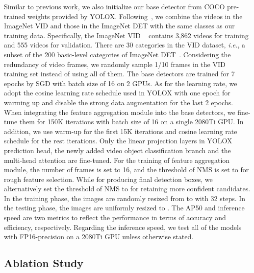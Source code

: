 \documentclass[letterpaper]{article} \usepackage{aaai23}  \usepackage{times}  \usepackage{helvet}  \usepackage{courier}  \usepackage[hyphens]{url}  \usepackage{graphicx} \urlstyle{rm} \def\UrlFont{\rm}  \usepackage{natbib}  \usepackage{caption} \usepackage{xcolor}
\begin{document}
Similar to previous work, we also initialize our base detector from COCO pre-trained weights provided by YOLOX. Following~\cite{zhu2017flow,wu2019sequence,gong2021temporal}, we combine the videos in the ImageNet VID and those in the ImageNet DET with the same classes as our training data. Specifically, the ImageNet VID ~\cite{russakovsky2015imagenet} contains 3,862 videos for training and 555 videos for validation. There are 30 categories in the VID dataset, \emph{i.e.}, a subset of the 200 basic-level categories of ImageNet DET~\cite{russakovsky2015imagenet}.  Considering the redundancy of video frames, we randomly sample 1/10 frames in the VID training set instead of using all of them. The base detectors are trained for 7 epochs by SGD with batch size of 16 on 2 GPUs. As for the learning rate, we adopt the cosine learning rate schedule used in YOLOX with one epoch for warming up and disable the strong data augmentation for the last 2 epochs. When integrating the feature aggregation module into the base detectors, we fine-tune them for 150K iterations with batch size of 16 on a single 2080Ti GPU. In addition, we use warm-up for the first 15K iterations and cosine learning rate schedule for the rest iterations. Only the linear projection layers in YOLOX prediction head, the newly added video object classification branch and the multi-head attention are fine-tuned. For the training of feature aggregation module, the number of frames  is set to 16, and the threshold of NMS is set to  for rough feature selection. While for producing final detection boxes, we alternatively set the threshold of NMS to  for retaining more confident candidates. In the training phase, the images are randomly resized from  to  with 32 steps. In the testing phase, the images are uniformly resized to . The AP50 and inference speed are two metrics to reflect the performance in terms of accuracy and efficiency, respectively. Regarding the inference speed, we test all of the models with FP16-precision on a 2080Ti GPU unless otherwise stated.



\subsection{Ablation Study}
\end{document}
